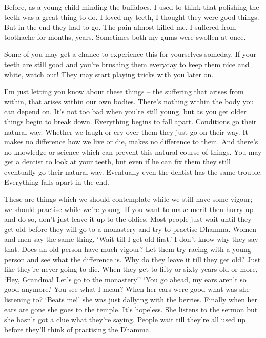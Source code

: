 Before, as a young child minding the buffaloes, I used to think that polishing the teeth was a great thing to do. I loved my teeth, I thought they were good things. But in the end they had to go. The pain almost killed me. I suffered from toothache for months, years. Sometimes both my gums were swollen at once. 

Some of you may get a chance to experience this for yourselves someday. If your teeth are still good and you're brushing them everyday to keep them nice and white, watch out! They may start playing tricks with you later on. 

I'm just letting you know about these things -- the suffering that arises from within, that arises within our own bodies. There's nothing within the body you can depend on. It's not too bad when you're still young, but as you get older things begin to break down. Everything begins to fall apart. Conditions go their natural way. Whether we laugh or cry over them they just go on their way. It makes no difference how we live or die, makes no difference to them. And there's no knowledge or science which can prevent this natural course of things. You may get a dentist to look at your teeth, but even if he can fix them they still eventually go their natural way. Eventually even the dentist has the same trouble. Everything falls apart in the end. 

These are things which we should contemplate while we still have some vigour; we should practise while we're young. If you want to make merit then hurry up and do so, don't just leave it up to the oldies. Most people just wait until they get old before they will go to a monastery and try to practise Dhamma. Women and men say the same thing, `Wait till I get old first.' I don't know why they say that. Does an old person have much vigour? Let them try racing with a young person and see what the difference is. Why do they leave it till they get old? Just like they're never going to die. When they get to fifty or sixty years old or more, `Hey, Grandma! Let's go to the monastery!' `You go ahead, my ears aren't so good anymore.' You see what I mean? When her ears were good what was she listening to? `Beats me!' she was just dallying with the berries. Finally when her ears are gone she goes to the temple. It's hopeless. She listens to the sermon but she hasn't got a clue what they're saying. People wait till they're all used up before they'll think of practising the Dhamma. 

